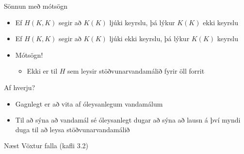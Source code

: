 \documentclass[handout]{beamer}
\begin{document}
\begin{frame}{Sönnun með mótsögn}
\begin{itemize}
 \item Ef $H(K, K)$ segir að $K(K)$ ljúki keyrslu, þá lýkur $K(K)$ ekki keyrslu
 \item Ef $H(K, K)$ segir að $K(K)$ ljúki ekki keyrslu, þá lýkur $K(K)$ keyrslu
 \item Mótsögn!
 \begin{itemize}
  \item Ekki er til $H$ sem leysir stöðvunarvandamálið fyrir öll forrit
 \end{itemize}
\end{itemize}
\end{frame}

\begin{frame}{Af hverju?}
    \begin{itemize}
        \item Gagnlegt er að vita af óleysanlegum vandamálum
        \item Til að sýna að vandamál sé óleysanlegt dugar að sýna að lausn á því myndi duga til að leysa stöðvunarvandamálið
    \end{itemize}
\end{frame}


\begin{frame}{Næst}
Vöxtur falla (kafli 3.2)
\end{frame}
\end{document}
